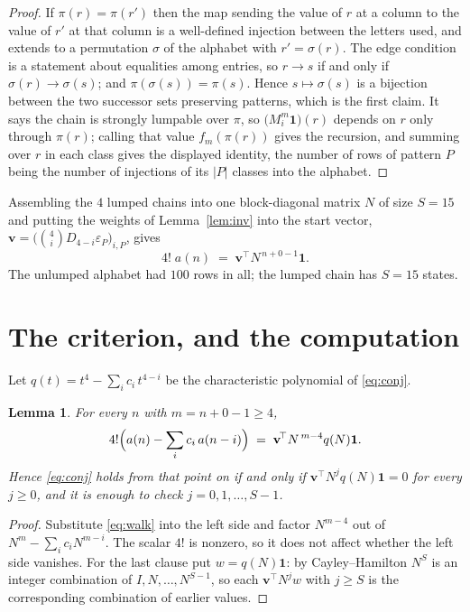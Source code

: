 \documentclass[11pt,a4paper]{article}
\theoremstyle{plain}
\newtheorem{lemma}[theorem]{Lemma}
\theoremstyle{definition}
\begin{document}
\begin{proof}
If $\pi(r)=\pi(r')$ then the map sending the value of $r$ at a column to the value of $r'$
at that column is a well-defined injection between the letters used, and extends to a
permutation $\sigma$ of the alphabet with $r'=\sigma(r)$. The edge condition is a statement
about equalities among entries, so $r\to s$ if and only if $\sigma(r)\to\sigma(s)$; and
$\pi(\sigma(s))=\pi(s)$. Hence $s\mapsto\sigma(s)$ is a bijection between the two successor
sets preserving patterns, which is the first claim. It says the chain is strongly lumpable
over $\pi$, so $\bigl(M_i^{m}\mathbf{1}\bigr)(r)$ depends on $r$ only through $\pi(r)$;
calling that value $f_m(\pi(r))$ gives the recursion, and summing over $r$ in each class
gives the displayed identity, the number of rows of pattern $P$ being the number of
injections of its $|P|$ classes into the alphabet.
\end{proof}

Assembling the $4$ lumped chains into one block-diagonal matrix $N$ of size $S=15$ and
putting the weights of Lemma~\ref{lem:inv} into the start vector,
$\mathbf{v}=\bigl(\binom{4}{i}D_{4-i}\varepsilon_P\bigr)_{i,P}$, gives
\begin{equation}\label{eq:walk}
4!\;a(n)\;=\;\mathbf{v}^{\!\top}N^{\,n+0-1}\mathbf{1} .
\end{equation}
The unlumped alphabet had $100$ rows in all; the lumped chain has $S=15$ states.

\section{The criterion, and the computation}

Let $q(t)=t^{4}-\sum_i c_i\,t^{4-i}$ be the characteristic polynomial of
\eqref{eq:conj}.

\begin{lemma}\label{lem:crit}
For every $n$ with $m=n+0-1\ge4$,
\[
4!\Bigl(a(n)-\sum_i c_i\,a(n-i)\Bigr)\;=\;\mathbf{v}^{\!\top}N^{\,m-4}q(N)\mathbf{1} .
\]
Hence \eqref{eq:conj} holds from that point on if and only if
$\mathbf{v}^{\!\top}N^{j}q(N)\mathbf{1}=0$ for every $j\ge0$, and it is enough to check
$j=0,1,\dots,S-1$.
\end{lemma}

\begin{proof}
Substitute \eqref{eq:walk} into the left side and factor $N^{m-4}$ out of
$N^{m}-\sum_i c_iN^{m-i}$. The scalar $4!$ is nonzero, so it does not affect whether
the left side vanishes. For the last clause put $w=q(N)\mathbf{1}$: by Cayley--Hamilton
$N^{S}$ is an integer combination of $I,N,\dots,N^{S-1}$, so each
$\mathbf{v}^{\!\top}N^{j}w$ with $j\ge S$ is the corresponding combination of earlier
values.
\end{proof}
\end{document}
